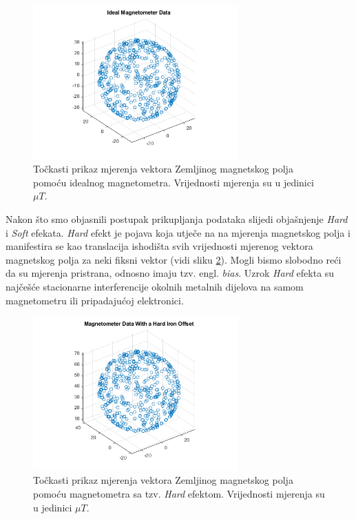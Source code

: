 \documentclass[times, utf8, diplomski, numeric]{templates/template}
\begin{document}
{{{{                \begin{figure}[htb]
                \centering
                \includegraphics[width=0.7\textwidth]{images/mag_ideal.png}
                \caption{Točkasti prikaz mjerenja vektora Zemljinog magnetskog polja pomoću idealnog magnetometra. Vrijednosti mjerenja su u jedinici $\mu T$.}
                \label{fig:mag_ideal}
                \end{figure}

                Nakon što smo objasnili postupak prikupljanja podataka slijedi objašnjenje \emph{Hard} i \emph{Soft} efekata. \emph{Hard} efekt je pojava koja utječe na na mjerenja magnetskog polja i manifestira se kao translacija ishodišta svih vrijednosti mjerenog vektora magnetskog polja za neki fiksni vektor (vidi sliku \ref{fig:mag_hard}). Mogli bismo slobodno reći da su mjerenja pristrana, odnosno imaju tzv. engl. \emph{bias}. Uzrok \emph{Hard} efekta su najčešće stacionarne interferencije okolnih metalnih dijelova na samom magnetometru ili pripadajućoj elektronici. 

                \begin{figure}[htb]
                \centering
                \includegraphics[width=0.7\textwidth]{images/mag_hard.png}
                \caption{Točkasti prikaz mjerenja vektora Zemljinog magnetskog polja pomoću magnetometra sa tzv. \emph{Hard} efektom. Vrijednosti mjerenja su u jedinici $\mu T$.}
                \label{fig:mag_hard}
                \end{figure}

}}}}
\end{document}
